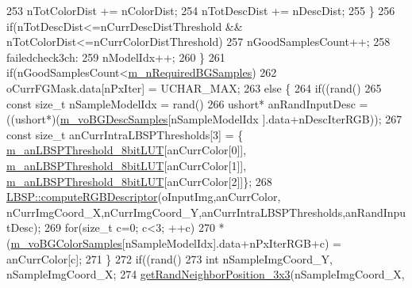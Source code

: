 \begin{DoxyCode}
253                     nTotColorDist += nColorDist;
254                     nTotDescDist += nDescDist;
255                 \}
256                 \textcolor{keywordflow}{if}(nTotDescDist<=nCurrDescDistThreshold && nTotColorDist<=nCurrColorDistThreshold)
257                     nGoodSamplesCount++;
258                 failedcheck3ch:
259                 nModelIdx++;
260             \}
261             \textcolor{keywordflow}{if}(nGoodSamplesCount<\mbox{\hyperlink{class_background_subtractor_l_o_b_s_t_e_r_acb558aefc1b6205a63c1906b6fd1eeff}{m\_nRequiredBGSamples}})
262                 oCurrFGMask.data[nPxIter] = UCHAR\_MAX;
263             \textcolor{keywordflow}{else} \{
264                 \textcolor{keywordflow}{if}((rand()%
265                     \textcolor{keyword}{const} \textcolor{keywordtype}{size\_t} nSampleModelIdx = rand()%
266                     ushort* anRandInputDesc = ((ushort*)(\mbox{\hyperlink{class_background_subtractor_l_o_b_s_t_e_r_a3c49866ae652423b2173215957907d04}{m\_voBGDescSamples}}[nSampleModelIdx
      ].data+nDescIterRGB));
267                     \textcolor{keyword}{const} \textcolor{keywordtype}{size\_t} anCurrIntraLBSPThresholds[3] = \{
      \mbox{\hyperlink{class_background_subtractor_l_b_s_p_aefe69d94f08b2c4ba73ad1d254ad9153}{m\_anLBSPThreshold\_8bitLUT}}[anCurrColor[0]],
      \mbox{\hyperlink{class_background_subtractor_l_b_s_p_aefe69d94f08b2c4ba73ad1d254ad9153}{m\_anLBSPThreshold\_8bitLUT}}[anCurrColor[1]],
      \mbox{\hyperlink{class_background_subtractor_l_b_s_p_aefe69d94f08b2c4ba73ad1d254ad9153}{m\_anLBSPThreshold\_8bitLUT}}[anCurrColor[2]]\};
268                     \mbox{\hyperlink{class_l_b_s_p_a27a44cb6f6e3015ee26047bd3d84f892}{LBSP::computeRGBDescriptor}}(oInputImg,anCurrColor,
      nCurrImgCoord\_X,nCurrImgCoord\_Y,anCurrIntraLBSPThresholds,anRandInputDesc);
269                     \textcolor{keywordflow}{for}(\textcolor{keywordtype}{size\_t} c=0; c<3; ++c)
270                         *(\mbox{\hyperlink{class_background_subtractor_l_o_b_s_t_e_r_ac981b39f8ae7b28d3e4326d8e6be6332}{m\_voBGColorSamples}}[nSampleModelIdx].data+nPxIterRGB+c) = 
      anCurrColor[c];
271                 \}
272                 \textcolor{keywordflow}{if}((rand()%
273                     \textcolor{keywordtype}{int} nSampleImgCoord\_Y, nSampleImgCoord\_X;
274                     \mbox{\hyperlink{_rand_utils_8h_a76b18bef397ed044a6db9e3a63c69f69}{getRandNeighborPosition\_3x3}}(nSampleImgCoord\_X,

\end{DoxyCode}
